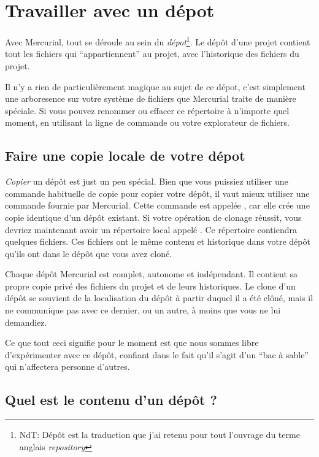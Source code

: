 \section{Travailler avec un dépot}

Avec Mercurial, tout se déroule au sein du \emph{dépot}\footnote{NdT: Dépôt est
la traduction que j'ai retenu pour tout l'ouvrage du terme anglais \textit{repository}}.
Le dépôt d'une projet contient tout les fichiers qui ``appartiennent'' 
au projet, avec l'historique des fichiers du projet.

Il n'y a rien de particulièrement magique au sujet de ce dépot, c'est
simplement une arboresence sur votre système de fichiers que Mercurial
traite de manière spéciale. Si vous pouvez renommer ou effacer ce répertoire
à n'importe quel moment, en utilisant la ligne de commande ou votre
explorateur de fichiers.

\subsection{Faire une copie locale de votre dépot}

\emph{Copier} un dépôt est just un peu spécial. Bien que vous 
puissiez utiliser une commande habituelle de copie pour copier
votre dépôt, il vaut mieux utiliser une commande fournie par
Mercurial. Cette commande est appelée , car elle
crée une copie identique d'un dépôt existant.
Si votre opération de clonage réussit, vous devriez maintenant
avoir un répertoire local appelé . Ce répertoire
contiendra quelques fichiers.
Ces fichiers ont le même contenu et historique dans votre dépôt
qu'ils ont dans le dépôt que vous avez cloné.

Chaque dépôt Mercurial est complet, autonome et indépendant. Il
contient sa propre copie privé des fichiers du projet et de leurs
historiques. Le clone d'un dépôt se souvient de la localisation du
dépôt à partir duquel il a été clôné, mais il ne communique pas avec
ce dernier, ou un autre, à moins que vous ne lui demandiez.

Ce que tout ceci signifie pour le moment est que nous sommes libre
d'expérimenter avec ce dépôt, confiant dans le fait qu'il s'agit d'un
``bac à sable'' qui n'affectera personne d'autres.

\subsection{Quel est le contenu d'un dépôt ?}

